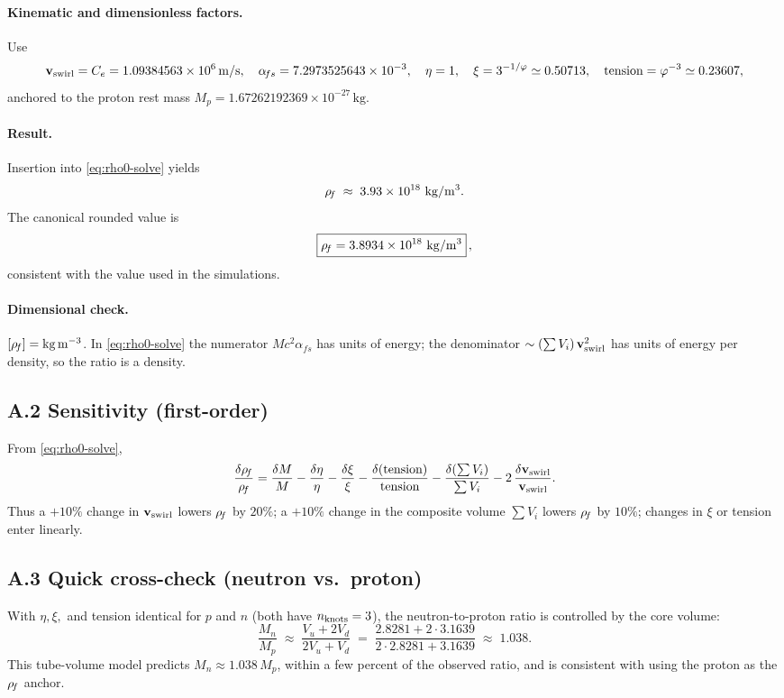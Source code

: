 \paragraph{Kinematic and dimensionless factors.}
Use
\[
    \mathbf{v}_{\mathrm{swirl}} = C_e = 1.09384563\times10^6\,\mathrm{m/s},\quad
    \alpha_{\!fs}=7.2973525643\times10^{-3},\quad
    \eta=1,\quad \xi = 3^{-1/\varphi}\simeq 0.50713,\quad
    \text{tension} = \varphi^{-3} \simeq 0.23607,
\]
anchored to the proton rest mass \(M_p=1.67262192369\times10^{-27}\,\mathrm{kg}\).

\paragraph{Result.}
Insertion into \eqref{eq:rho0-solve} yields
\[
    \rhoF \;\approx\; 3.93\times 10^{18}\ \mathrm{kg/m^3}.
\]
The canonical rounded value is
\[
    \boxed{ \rhoF = 3.8934\times 10^{18}\ \mathrm{kg/m^3} }\,,
\]
consistent with the value used in the simulations.

\paragraph{Dimensional check.}
\([\rho_{\!f}]=\mathrm{kg\,m^{-3}}\).
In \eqref{eq:rho0-solve} the numerator \(M c^2\alpha_{\!fs}\) has units of energy; the denominator
\(\sim (\sum V_i)\,\mathbf{v}_{\mathrm{swirl}}^{2}\) has units of energy per density, so the ratio is a density.

\subsection*{A.2 Sensitivity (first-order)}
From \eqref{eq:rho0-solve},
\[
    \frac{\delta\rho_{\!f}}{\rho_{\!f}}
    = \frac{\delta M}{M}
    - \frac{\delta\eta}{\eta}
    - \frac{\delta\xi}{\xi}
    - \frac{\delta(\text{tension})}{\text{tension}}
    - \frac{\delta(\sum V_i)}{\sum V_i}
    - 2\,\frac{\delta \mathbf{v}_{\mathrm{swirl}}}{\mathbf{v}_{\mathrm{swirl}}}.
\]
Thus a \(+10\%\) change in \(\mathbf{v}_{\mathrm{swirl}}\) lowers \(\rho_{\!f}\) by \(20\%\); a \(+10\%\) change in the composite volume \(\sum V_i\) lowers \(\rho_{\!f}\) by \(10\%\); changes in \(\xi\) or tension enter linearly.

\subsection*{A.3 Quick cross-check (neutron vs.\ proton)}
With \(\eta,\xi,\) and tension identical for \(p\) and \(n\) (both have \(n_{\rm knots}=3\)),
the neutron-to-proton ratio is controlled by the core volume:
\[
    \frac{M_n}{M_p}\;\approx\;\frac{V_u + 2V_d}{2V_u + V_d}
    \;=\; \frac{2.8281 + 2\cdot 3.1639}{2\cdot 2.8281 + 3.1639}
    \;\approx\; 1.038.
\]
This tube-volume model predicts \(M_n \approx 1.038\,M_p\), within a few percent of the observed ratio, and is consistent with using the proton as the \(\rho_{\!f}\) anchor.
